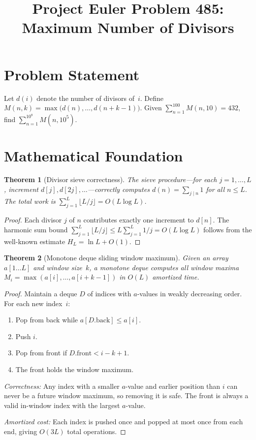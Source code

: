 \documentclass[12pt]{article}
\title{Project Euler Problem 485: Maximum Number of Divisors}
\author{}
\date{}
\newtheorem{theorem}{Theorem}
\begin{document}
\maketitle

\section{Problem Statement}
Let $d(i)$ denote the number of divisors of~$i$. Define $M(n,k) = \max\bigl(d(n),\ldots,d(n+k-1)\bigr)$. Given $\sum_{n=1}^{100}M(n,10)=432$, find $\sum_{n=1}^{10^8}M(n,10^5)$.

\section{Mathematical Foundation}

\begin{theorem}[Divisor sieve correctness]
The sieve procedure---for each $j=1,\ldots,L$, increment $d[j],d[2j],\ldots$---correctly computes $d(n) = \sum_{j\mid n}1$ for all $n\le L$. The total work is $\sum_{j=1}^L\lfloor L/j\rfloor = O(L\log L)$.
\end{theorem}

\begin{proof}
Each divisor $j$ of $n$ contributes exactly one increment to $d[n]$. The harmonic sum bound $\sum_{j=1}^L\lfloor L/j\rfloor \le L\sum_{j=1}^L 1/j = O(L\log L)$ follows from the well-known estimate $H_L = \ln L + O(1)$.
\end{proof}

\begin{theorem}[Monotone deque sliding window maximum]
Given an array $a[1\ldots L]$ and window size~$k$, a monotone deque computes all window maxima $M_i = \max(a[i],\ldots,a[i+k-1])$ in $O(L)$ amortized time.
\end{theorem}

\begin{proof}
Maintain a deque $D$ of indices with $a$-values in weakly decreasing order. For each new index~$i$:
\begin{enumerate}
\item Pop from back while $a[D.\mathrm{back}]\le a[i]$.
\item Push $i$.
\item Pop from front if $D.\mathrm{front} < i-k+1$.
\item The front holds the window maximum.
\end{enumerate}
\emph{Correctness:} Any index with a smaller $a$-value and earlier position than $i$ can never be a future window maximum, so removing it is safe. The front is always a valid in-window index with the largest $a$-value.

\emph{Amortized cost:} Each index is pushed once and popped at most once from each end, giving $O(3L)$ total operations.
\end{proof}
\end{document}
